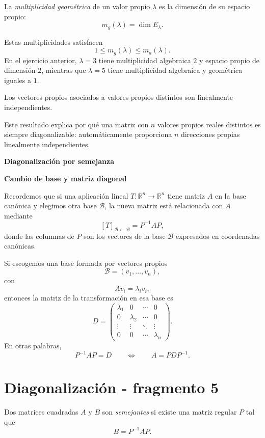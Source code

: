 \begin{definition}
La \emph{multiplicidad geométrica} de un valor propio $\lambda$ es la dimensión de su espacio propio:
\[
m_g(\lambda)=\dim E_\lambda.
\]
\end{definition}

Estas multiplicidades satisfacen
\[
1\leq m_g(\lambda)\leq m_a(\lambda).
\]
En el ejercicio anterior, $\lambda=3$ tiene multiplicidad algebraica $2$ y espacio propio de dimensión $2$, mientras que $\lambda=5$ tiene multiplicidad algebraica y geométrica iguales a $1$.

\begin{proposition}
Los vectores propios asociados a valores propios distintos son linealmente independientes.
\end{proposition}

Este resultado explica por qué una matriz con $n$ valores propios reales distintos es siempre diagonalizable: automáticamente proporciona $n$ direcciones propias linealmente independientes.

\textbf{Diagonalización por semejanza}

\textbf{Cambio de base y matriz diagonal}

Recordemos que si una aplicación lineal $T:\mathbb{R}^n\to\mathbb{R}^n$ tiene matriz $A$ en la base canónica y elegimos otra base $\mathcal B$, la nueva matriz está relacionada con $A$ mediante
\[
[T]_{\mathcal B\leftarrow\mathcal B}=P^{-1}AP,
\]
donde las columnas de $P$ son los vectores de la base $\mathcal B$ expresados en coordenadas canónicas.

Si escogemos una base formada por vectores propios
\[
\mathcal B=(v_1,\ldots,v_n),
\]
con
\[
Av_i=\lambda_i v_i,
\]
entonces la matriz de la transformación en esa base es
\[
D=\begin{pmatrix}
\lambda_1&0&\cdots&0\\
0&\lambda_2&\cdots&0\\
\vdots&\vdots&\ddots&\vdots\\
0&0&\cdots&\lambda_n
\end{pmatrix}.
\]
En otras palabras,
\[
P^{-1}AP=D
\qquad\Longleftrightarrow\qquad
A=PDP^{-1}.
\]


\section{Diagonalización - fragmento 5}
\begin{definition}
Dos matrices cuadradas $A$ y $B$ son \emph{semejantes} si existe una matriz regular $P$ tal que
\[
B=P^{-1}AP.
\]
\end{definition}

